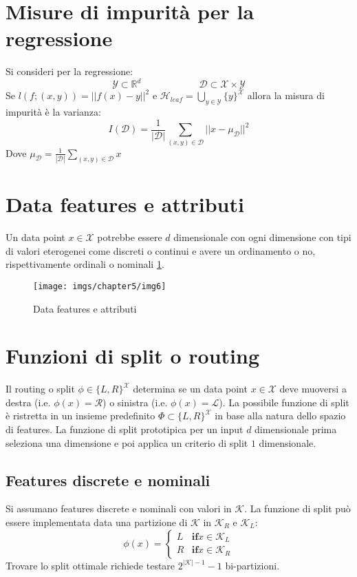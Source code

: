 \section{Misure di impurit\`a per la regressione}
Si consideri per la regressione:
$$\mathcal{Y}\subset\mathbb{R}^d\qquad\qquad\qquad\mathcal{D}\subset\mathcal{X}\times\mathcal{Y}$$
Se $l(f;(x,y))=||f(x)-y||^2$ e $\mathcal{H}_{leaf} = \bigcup\limits_{y\in\mathcal{Y}}\{y\}^\mathcal{X}$ allora la misura di impurit\`a \`e la varianza:
$$I(\mathcal{D})=\dfrac{1}{|\mathcal{D}|}\sum\limits_{(x,y)\in\mathcal{D}}||x-\mu_\mathcal{D}||^2$$
Dove $\mu_\mathcal{D} = \frac{1}{|\mathcal{D}|}\sum\limits_{(x,y)\in\mathcal{D}}x$

\section{Data features e attributi}
Un data point $x\in\mathcal{X}$ potrebbe essere $d$ dimensionale con ogni dimensione con tipi di valori eterogenei come discreti o continui e avere un ordinamento o no, rispettivamente ordinali o nominali \ref{fig:chapter05-06}.

\begin{figure}
	\centering
	\texttt{[image: imgs/chapter5/img6]}
	\caption{Data features e attributi}
	\label{fig:chapter05-06}
\end{figure}

\section{Funzioni di split o routing}
Il routing o split $\phi\in\{L,R\}^{\mathcal{X}}$ determina se un data point $x\in\mathcal{X}$ deve muoversi a destra (i.e. $\phi(x)=\mathcal{R}$) o sinistra (i.e. $\phi(x)=\mathcal{L}$).
La possibile funzione di split \`e ristretta in un insieme predefinito $\Phi\subset\{L,R\}^\mathcal{X}$ in base alla natura dello spazio di features.
La funzione di split prototipica per un input $d$ dimensionale prima seleziona una dimensione e poi applica un criterio di split $1$ dimensionale.

	\subsection{Features discrete e nominali}
	Si assumano features discrete e nominali con valori in $\mathcal{K}$.
	La funzione di split pu\`o essere implementata data una partizione di $\mathcal{K}$ in $\mathcal{K}_R$ e $\mathcal{K}_L$:
	$$\phi(x) = \begin{cases}L &\mathbf{if} x\in\mathcal{K}_L\\
		R &\mathbf{if} x\in\mathcal{K}_R
	\end{cases}$$
	Trovare lo split ottimale richiede testare $2^{|\mathcal{K}|-1}-1$ bi-partizioni.
	
